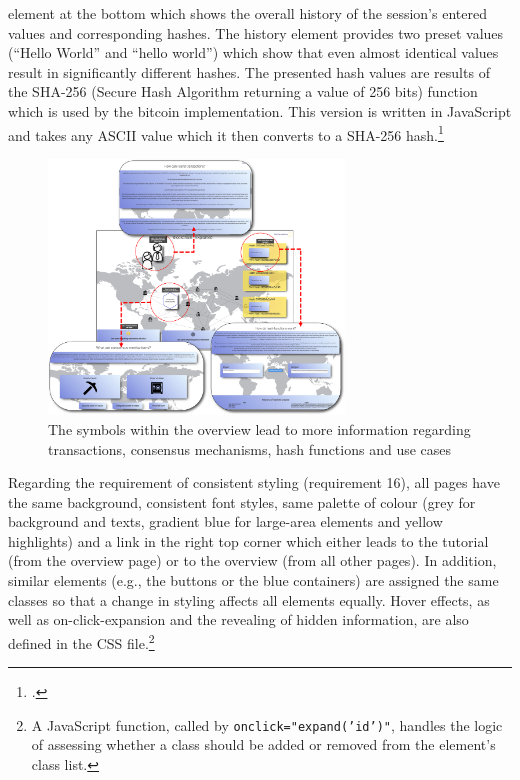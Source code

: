 element at the bottom which shows the overall history of the session's entered values and corresponding hashes. The history element provides two preset values (\enquote{Hello World} and \enquote{hello world}) which show that even almost identical values result in significantly different hashes. The presented hash values are results of the SHA-256 (Secure Hash Algorithm returning a value of 256 bits) function which is used by the bitcoin implementation. This version is written in JavaScript and takes any ASCII value which it then converts to a SHA-256 hash.\footcite[][]{LuffJavaScriptSHA256demo2014}

\begin{figure}
    \centering
    \includegraphics[width=0.7\textwidth]{latex-vorlage_v1.5/graphics/overview.png}
    \caption[The symbols within the overview lead to more information regarding transactions, consensus mechanisms, hash functions and use cases]{The symbols within the overview lead to more information regarding transactions, consensus mechanisms, hash functions and use cases\protect\footnotemark}
    \label{fig:AniOW}
\end{figure}

Regarding the requirement of consistent styling (requirement 16), all pages have the same background, consistent font styles, same palette of colour (grey for background and texts, gradient blue for large-area elements and yellow highlights) and a link in the right top corner which either leads to the tutorial (from the overview page) or to the overview (from all other pages). In addition, similar elements (e.g., the buttons or the blue containers) are assigned the same classes so that a change in styling affects all elements equally. Hover effects, as well as on-click-expansion and the revealing of hidden information, are also defined in the CSS file.\footnote{A JavaScript function, called by \texttt{onclick="expand('id')"}, handles the logic of assessing whether a class should be added or removed from the element's class list.} 



